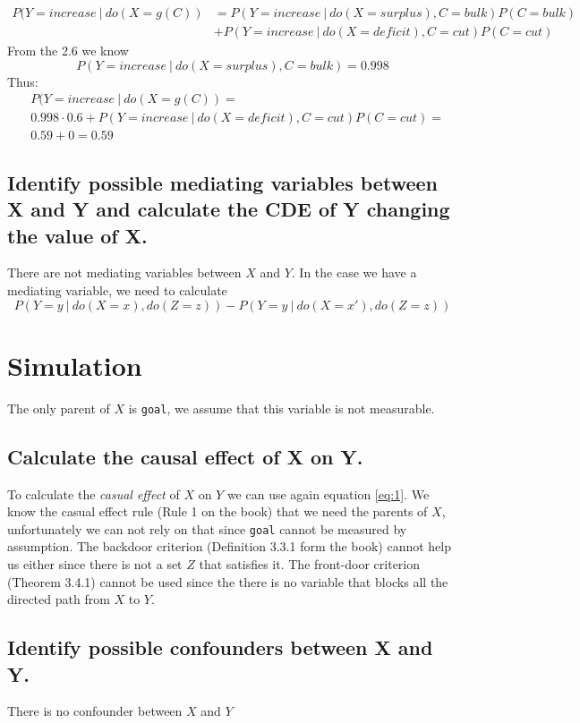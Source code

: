 \documentclass[11pt]{article}
\newcommand\given[1][]{\:#1\vert\:}
\begin{document}
\begin{align*}
P (Y = increase \given do(X=g(C)) &=  P(Y=increase \given do(X=surplus),C=bulk)P(C=bulk) \\
&+ P(Y= increase \given do(X=deficit),C=cut)P(C=cut)
\end{align*}
From the 2.6 we know 
$$P(Y=increase \given do(X=surplus),C=bulk) =  0.998$$
Thus:
\begin{align*}
&P (Y = increase \given do(X=g(C)) = \\
& 0.998 \cdot 0.6 + P(Y= increase \given do(X=deficit),C=cut)P(C=cut) = \\
&0.59 + 0 = 0.59
\end{align*}

\subsection{Identify possible mediating variables between X and Y and calculate the CDE of Y changing the value of X.}
There are not mediating variables between $X$ and $Y$. In the case we have a mediating variable, we need to calculate
\begin{equation}
P(Y=y \given do(X=x), do(Z=z)) - P(Y=y \given do(X = x'), do(Z=z))
\end{equation}

\section{Simulation}

The only parent of $X$ is \texttt{goal}, we assume that this variable is not measurable.
\subsection{Calculate the causal effect of X on Y.}
To calculate the \emph{casual effect} of $X$ on $Y$ we can use again equation \ref{eq:1}. We know the casual effect rule (Rule 1 on the book) that we need the parents of $X$, unfortunately we can not rely on  that since \texttt{goal} cannot be measured by assumption.
The backdoor criterion (Definition 3.3.1 form the book) cannot help us either since there is not a set $Z$ that satisfies it. 
The front-door criterion (Theorem 3.4.1) cannot be used since the there is no variable that blocks all the directed path from $X$ to $Y$.

\subsection{Identify possible confounders between X and Y.}
There is no confounder between $X$ and $Y$
\end{document}

